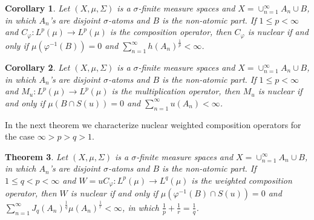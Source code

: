 \documentclass{amsart}
\newtheorem{thm}{Theorem}[section]
\newtheorem{cor}[thm]{Corollary}
\theoremstyle{definition}\newtheorem{defn}[thm]{Definition}
\theoremstyle{remark}
\numberwithin{equation}{section}
\begin{document}
\begin{cor}
Let $(X, \mu, \Sigma)$ is a $\sigma$-finite measure spaces and $X=\cup^{\infty}_{n=1}A_n\cup B$, in which $A_n$'s are disjoint $\sigma$-atoms and $B$ is the non-atomic part. If $1\leq p<\infty$  and $C_{\varphi}:L^p(\mu)\rightarrow L^p(\mu)$ is the composition operator, then $C_{\varphi}$ is nuclear if and only if $\mu(\varphi^{-1}(B))=0$ and $\sum^{\infty}_{n=1}h(A_n)^{\frac{1}{p}}<\infty$.
\end{cor}
\begin{cor}
Let $(X, \mu, \Sigma)$ is a $\sigma$-finite measure spaces and $X=\cup^{\infty}_{n=1}A_n\cup B$, in which $A_n$'s are disjoint $\sigma$-atoms and $B$ is the non-atomic part. If $1\leq p<\infty$  and $M_u:L^p(\mu)\rightarrow L^p(\mu)$ is the multiplication operator, then $M_u$ is nuclear if and only if $\mu(B\cap S(u))=0$ and $\sum^{\infty}_{n=1}u(A_n)<\infty$.
\end{cor}
In the next theorem we characterize nuclear weighted composition operators for the case $\infty>p>q>1$.
\begin{thm}\label{n.pq}
Let $(X, \mu, \Sigma)$ is a $\sigma$-finite measure spaces and $X=\cup^{\infty}_{n=1}A_n\cup B$, in which $A_n$'s are disjoint $\sigma$-atoms and $B$ is the non-atomic part. If $1\leq q<p<\infty$  and $W=uC_{\varphi}:L^p(\mu)\rightarrow L^q(\mu)$ is the weighted composition operator, then $W$ is nuclear if and only if $\mu(\varphi^{-1}(B)\cap S(u))=0$ and $\sum^{\infty}_{n=1}J_q(A_n)^{\frac{1}{q}}\mu(A_n)^{\frac{1}{r}}<\infty$, in which $\frac{1}{p}+\frac{1}{r}=\frac{1}{q}$.
\end{thm}
\end{document}
